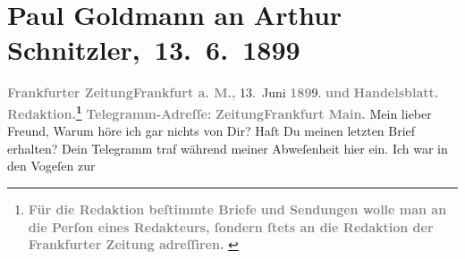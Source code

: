 

         
         \renewcommand{\erwaehntePersonen}{Personen: Richard Beer-Hofmann}
         \renewcommand{\erwaehnteInstitutionen}{Institutionen: Frankfurter Zeitung}
         \renewcommand{\erwaehnteOrte}{Orte: Deutschland, Frankfurt am Main, Frankreich, Italien, Kärnten, Salzburg, Südtirol, Tirol, Vosges, Wien}
         \renewcommand{\erwaehnteWerke}{}
               \section[ Paul Goldmann an Arthur Schnitzler, 13. 6. 1899]{ Paul Goldmann an Arthur Schnitzler, 13. 6. 1899}\nopagebreak{}\rehead{ }\begin{ledgroupsized}[t]{13cm}\normalsize\beginnumbering \toendnotes[C]{\smallbreak\pagebreak[2]} 
\toendnotes[C]{\smallbreak}\pstart
           \noindent{}{\pb}\textcolor{gray}{\textbf{\textbf{Frankfurter Zeitung}}}\hfill \textcolor{gray}{\textbf{\textbf{Frankfurt a. M.,}}}{ }13. Juni \textcolor{gray}{\textbf{189}}9.\pend
           \pstart
           \textcolor{gray}{\textbf{und}}\pend
           \pstart
           \textcolor{gray}{\textbf{Handelsblatt.}}\pend
           \pstart
           \textcolor{gray}{\textbf{\textbf{Redaktion.}\footnote{\noindent{}\textcolor{gray}{\textbf{ Für die Redaktion beſtimmte Briefe und Sendungen wolle man
                                  an die Perſon eines Redakteurs,
                              ſondern ſtets \textbf{an die Redaktion der Frankfurter Zeitung} adreſſiren. }}}}}\pend
           \pstart
           \textcolor{gray}{\textbf{Telegramm-Adreſſe:}}\pend
           \pstart
           \textcolor{gray}{\textbf{\textbf{ZeitungFrankfurt Main.}}}\pend
           \pstart\center{}Mein lieber Freund,\pend\pstart
           Warum höre ich gar nichts von Dir? Haſt Du meinen letzten Brief erhalten?\pend
           \pstart
           Dein Telegramm traf während meiner Abweſenheit hier ein. Ich war in den Vogeſen zur \label{K_L02877-1v}
\end{ledgroupsized}
